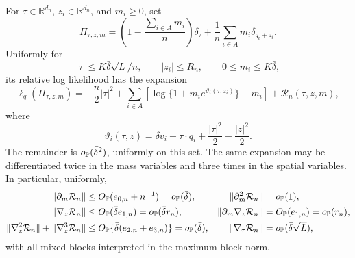 \begin{lemma}
For \(\tau\in\mathbb R^{d_n}\), \(z_i\in\mathbb R^{d_n}\), and
\(m_i\ge0\), set
\begin{equation}
\label{eq:finite-edge-candidate}
 \Pi_{\tau,z,m}
 =
 \left(1-\frac{\sum_{i\in A}m_i}{n}\right)\delta_\tau
 +\frac1n\sum_{i\in A}m_i\delta_{q_i+z_i}.
\end{equation}
Uniformly for
\[
 |\tau|\le K\bar\delta\sqrt L/n,\qquad |z_i|\le R_n,\qquad
 0\le m_i\le K\bar\delta,
\]
its relative log likelihood has the expansion
\begin{equation}
\label{eq:joint-finite-edge-expansion}
 \ell_q(\Pi_{\tau,z,m})
 =
 -\frac n2|\tau|^2
 +\sum_{i\in A}
 \left[
  \log\{1+m_i e^{\vartheta_i(\tau,z_i)}\}-m_i
 \right]
 +\mathcal R_n(\tau,z,m),
\end{equation}
where
\[
 \vartheta_i(\tau,z)
 =
 \delta v_i-\tau\cdot q_i+\frac{|\tau|^2}{2}-\frac{|z|^2}{2}.
\]
The remainder is \(o_{\mathbb P}(\bar\delta^2)\), uniformly on this set.  The
same expansion may be differentiated twice in the mass variables and
three times in the spatial variables.  In particular, uniformly,
\begin{align}
\label{eq:joint-finite-edge-derivatives}
 \|\partial_m\mathcal R_n\|
   &\le O_{\mathbb P}(e_{0,n}+n^{-1})=o_{\mathbb P}(\bar\delta),
 &\|\partial_m^2\mathcal R_n\|&=o_{\mathbb P}(1),\notag\\
 \|\nabla_z\mathcal R_n\|
   &\le O_{\mathbb P}(\bar\delta e_{1,n})
     =o_{\mathbb P}(\bar\delta r_n),
 &\|\partial_m\nabla_z\mathcal R_n\|
   &=O_{\mathbb P}(e_{1,n})=o_{\mathbb P}(r_n),\notag\\
 \|\nabla_z^2\mathcal R_n\|+
 \|\nabla_z^3\mathcal R_n\|
   &\le O_{\mathbb P}\{\bar\delta(e_{2,n}+e_{3,n})\}
     =o_{\mathbb P}(\bar\delta),
 &\|\nabla_\tau\mathcal R_n\|
   &=o_{\mathbb P}(\bar\delta\sqrt L),
\end{align}
with all mixed blocks interpreted in the maximum block norm.


\end{lemma}
